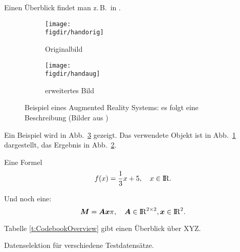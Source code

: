Einen Überblick findet man z.\,B.\ in \cite{Auer00:HTF}.

\begin{figure}[t]
	\centering
	
	\begin{subfigure}{0.45\linewidth}
		\centering
		\texttt{[image: \\figdir/handorig]}
		\caption{Originalbild}
		\label{FIG:arexorig}
	\end{subfigure}
	\begin{subfigure}{0.45\linewidth}
		\centering
		\texttt{[image: \\figdir/handaug]}
		\caption{erweitertes Bild}
		\label{FIG:arexaugm}
	\end{subfigure}
	\caption[AR Beispiel]
	{Beispiel eines Augmented Reality Systems: es folgt eine Beschreibung (Bilder aus \cite{Schmidt01:PAO})}
	\label{FIG:arex}
\end{figure}

Ein Beispiel wird in Abb.\ \ref{FIG:arex} gezeigt.
Das verwendete Objekt ist in Abb.\ \ref{FIG:arexorig} dargestellt, das Ergebnis in Abb.\ \ref{FIG:arexaugm}.

Eine Formel
\begin{equation}
\label{eq:cvp:test}
f(x) = \frac{1}{3} x + 5, \quad x \in \mathord{\mathrm{I\!R}}.
\end{equation}

Und noch eine:
\begin{equation}
\label{eq:cvp:matvec}
\bm{M}  = \bm{Ax} \pi, \quad \bm{A} \in \mathord{\mathrm{I\!R}}^{2 \times 2}, \bm{x} \in \mathord{\mathrm{I\!R}}^2.
\end{equation}

Tabelle \ref{t:CodebookOverview} gibt einen Überblick über XYZ.

\begin{table}[t]
	\centering\small
	
	\caption[Testtabelle]{Datenselektion für verschiedene Testdatensätze.}
	\label{t:CodebookOverview}
\end{table}


